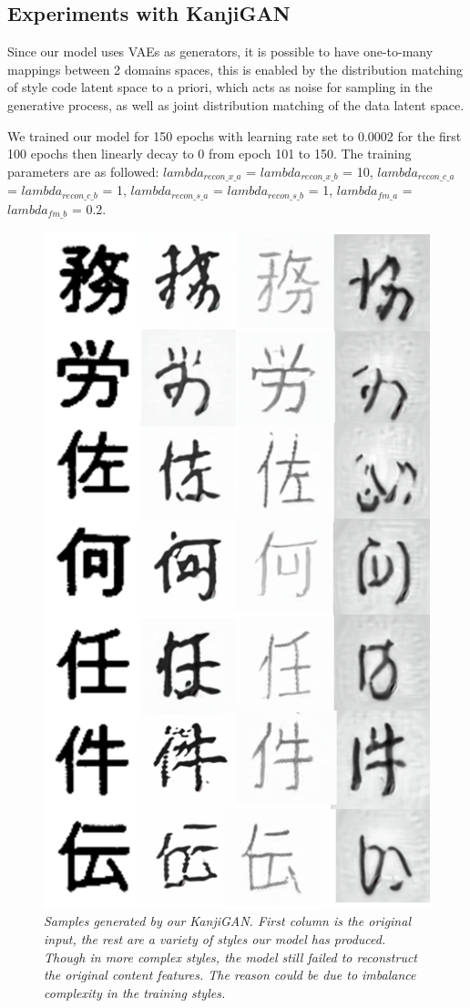 \documentclass[12pt]{report}
\begin{document}
\subsection{Experiments with KanjiGAN}

Since our model uses VAEs as generators, it is possible to have one-to-many mappings between 2 domains spaces, this is enabled by the distribution matching of style code latent space to a priori, which acts as noise for sampling in the generative process, as well as joint distribution matching of the data latent space.

We trained our model for 150 epochs with learning rate set to 0.0002 for the first 100 epochs then linearly decay to 0 from epoch 101 to 150. The training parameters are as followed: $lambda_{recon\_x\_a}$ = $lambda_{recon\_x\_b}$ = 10, $lambda_{recon\_c\_a}$ = $lambda_{recon\_c\_b}$ = 1, $lambda_{recon\_s\_a}$ = $lambda_{recon\_s\_b}$ = 1, $lambda_{fm\_a}$ = $lambda_{fm\_b}$ = 0.2. 

\begin{figure}[H]
	\centering
	\includegraphics[scale=0.9]{kanji-gan-results}
	\caption{\textit{Samples generated by our KanjiGAN. First column is the original input, the rest are a variety of styles our model has produced. Though in more complex styles, the model still failed to reconstruct the original content features. The reason could be due to imbalance complexity in the training styles.}}
	\label{fig:kanji-gan-results}
\end{figure}
\end{document}
